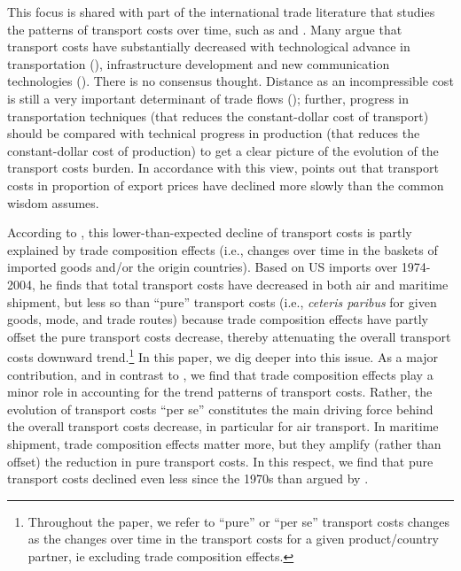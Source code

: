 \documentclass[a4paper,11pt]{article}
\begin{document}
This focus is shared with part of the international trade literature that studies the patterns of transport costs over time, such as \cite{hummels2007} and \cite{Behar_Venables}.
Many argue that transport costs have substantially decreased with technological advance in transportation (\citealp{levinson2016box}), infrastructure development and new communication technologies (\citealp{Lafourcade_Thisse}).
There is no consensus thought.
Distance as an incompressible cost is still a very important determinant of trade flows (\citealp{Disdier_Head08}); further, progress in transportation techniques (that reduces the constant-dollar cost of transport) should be compared with technical progress in production (that reduces the constant-dollar cost of production) to get a clear picture of the evolution of the transport costs burden.
In accordance with this view, \cite{hummels2007} points out that transport costs in proportion of export prices have declined more slowly than the common wisdom assumes.\smallskip

According to \cite{hummels2007}, this lower-than-expected decline of transport costs is partly explained by trade composition effects (i.e., changes over time in the baskets of imported goods and/or the origin countries).
Based on US imports over 1974-2004, he finds that total transport costs have decreased in both air and maritime shipment, but less so than ``pure'' transport costs (i.e., \textit{ceteris paribus} for given goods, mode, and trade routes) because trade composition effects have partly offset the pure transport costs decrease, thereby attenuating the overall transport costs downward trend.\footnote{Throughout the paper, we refer to ``pure'' or ``per se'' transport costs changes as the changes over time in the transport costs for a given product/country partner, ie excluding trade composition effects.} In this paper, we dig deeper into this issue.
As a major contribution, and in contrast to \cite{hummels2007}, we find that trade composition effects play a minor role in accounting for the trend patterns of transport costs.
Rather, the evolution of transport costs ``per se'' constitutes the main driving force behind the overall transport costs decrease, in particular for air transport.
In maritime shipment, trade composition effects matter more, but they amplify (rather than offset) the reduction in pure transport costs.
In this respect, we find that pure transport costs declined even less since the 1970s than argued by \cite{hummels2007}.\medskip
\end{document}

